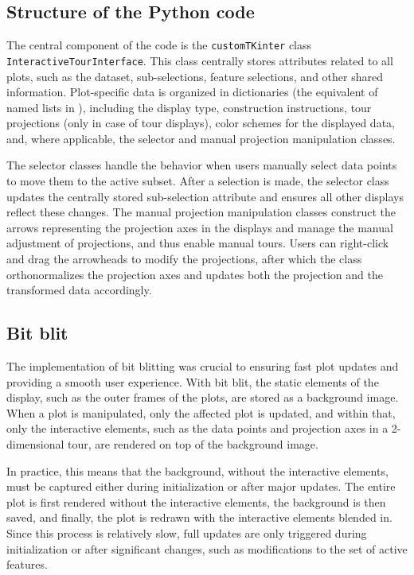 \documentclass[article]{ajs}
\begin{document}
\subsection{Structure of the Python code}

The central component of the  code is the \texttt{customTKinter} class \texttt{InteractiveTourInterface}. This class centrally stores attributes related to all plots, such as the dataset, sub-selections, feature selections, and other shared information. Plot-specific data is organized in dictionaries (the  equivalent of named lists in ), including the display type, construction instructions, tour projections (only in case of tour displays), color schemes for the displayed data, and, where applicable, the selector and manual projection manipulation classes.

The selector classes handle the behavior when users manually select data points to move them to the active subset. After a selection is made, the selector class updates the centrally stored sub-selection attribute and ensures all other displays reflect these changes. The manual projection manipulation classes construct the arrows representing the projection axes in the displays and manage the manual adjustment of projections, and thus enable manual tours. Users can right-click and drag the arrowheads to modify the projections, after which the class orthonormalizes the projection axes and updates both the projection and the transformed data accordingly.

\subsection{Bit blit}

The implementation of bit blitting was crucial to ensuring fast plot updates and providing a smooth user experience. With bit blit, the static elements of the display, such as the outer frames of the plots, are stored as a background image. When a plot is manipulated, only the affected plot is updated, and within that, only the interactive elements, such as the data points and projection axes in a 2-dimensional tour, are rendered on top of the background image.

In practice, this means that the background, without the interactive elements, must be captured either during initialization or after major updates. The entire plot is first rendered without the interactive elements, the background is then saved, and finally, the plot is redrawn with the interactive elements blended in. Since this process is relatively slow, full updates are only triggered during initialization or after significant changes, such as modifications to the set of active features.
\end{document}
